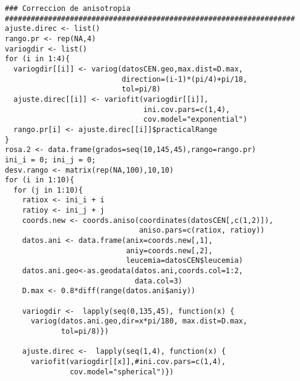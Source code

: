 \documentclass[11pt, oneside]{book}
\begin{document}
\begin{verbatim}
### Correccion de anisotropia
###################################################################
ajuste.direc <- list()
rango.pr <- rep(NA,4)
variogdir <- list()
for (i in 1:4){
  variogdir[[i]] <- variog(datosCEN.geo,max.dist=D.max,
                           direction=(i-1)*(pi/4)+pi/18, 
						   tol=pi/8)
  ajuste.direc[[i]] <- variofit(variogdir[[i]],
                                ini.cov.pars=c(1,4),
                                cov.model="exponential")
  rango.pr[i] <- ajuste.direc[[i]]$practicalRange
}
rosa.2 <- data.frame(grados=seq(10,145,45),rango=rango.pr)
ini_i = 0; ini_j = 0;
desv.rango <- matrix(rep(NA,100),10,10)
for (i in 1:10){
  for (j in 1:10){
    ratiox <- ini_i + i
    ratioy <- ini_j + j
    coords.new <- coords.aniso(coordinates(datosCEN[,c(1,2)]), 
                               aniso.pars=c(ratiox, ratioy)) 
    datos.ani <- data.frame(anix=coords.new[,1],
	                        aniy=coords.new[,2],
                            leucemia=datosCEN$leucemia) 
    datos.ani.geo<-as.geodata(datos.ani,coords.col=1:2,
	                          data.col=3) 
    D.max <- 0.8*diff(range(datos.ani$aniy))
    
    variogdir <-  lapply(seq(0,135,45), function(x) {
      variog(datos.ani.geo,dir=x*pi/180, max.dist=D.max, 
	         tol=pi/8)})
    
    ajuste.direc <-  lapply(seq(1,4), function(x) {
      variofit(variogdir[[x]],#ini.cov.pars=c(1,4),
               cov.model="spherical")})
    

\end{verbatim}
\end{document}
